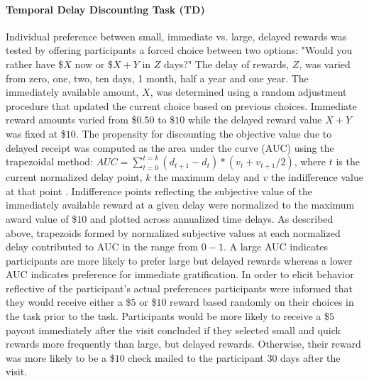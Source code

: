 \documentclass[utf8]{stylesheet}
\begin{document}
\paragraph{Temporal Delay Discounting Task (TD)} Individual preference between small, immediate vs. large, delayed rewards was tested by offering participants a forced choice between two options: "Would you rather have \$$X$ now or \$$X+Y$ in $Z$ days?" The delay of rewards, $Z$, was varied from zero, one, two, ten days, 1 month, half a year and one year. The immediately available amount, $X$, was determined using a random adjustment procedure that updated the current choice based on previous choices. Immediate reward amounts varied from \$$0.50$ to \$$10$ while the delayed reward value $X+Y$ was fixed at \$$10$. The propensity for discounting the objective value due to delayed receipt was computed as the area under the curve (AUC) using the trapezoidal method: $AUC = \sum_{t=0}^{t=k} (d_{t+1}-d_t)*(v_t+v_{t+1} /2)$, where $t$ is the current normalized delay point, $k$ the maximum delay and $v$ the indifference value at that point \citep{Borges2016,olson2007adolescents, myerson2001area}. Indifference points reflecting the subjective value of the immediately available reward at a given delay were normalized to the maximum award value of \$$10$ and plotted across annualized time delays. As described above, trapezoids formed by normalized subjective values at each normalized delay contributed to AUC in the range from $0-1$.  A large AUC indicates participants are more likely to prefer large but delayed rewards whereas a lower AUC indicates preference for immediate gratification. In order to elicit behavior reflective of the participant's actual preferences participants were informed that they would receive either a \$$5$ or \$$10$ reward based randomly on their choices in the task prior to the task. Participants would be more likely to receive a \$$5$ payout immediately after the visit concluded if they selected small and quick rewards more frequently than large, but delayed rewards. Otherwise, their reward was more likely to be a \$$10$ check mailed to the participant 30 days after the visit. 
\vspace{2pt}
\end{document}
